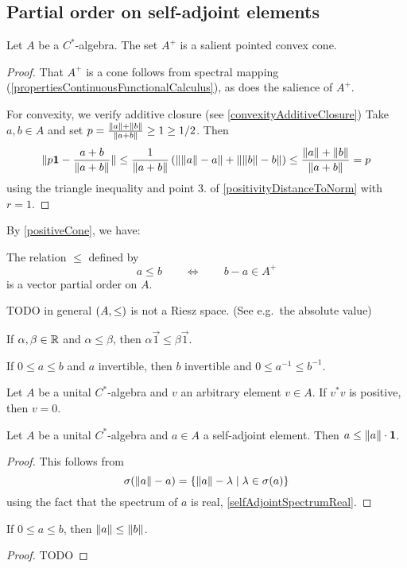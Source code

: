 \subsection{Partial order on self-adjoint elements}
\begin{proposition}
Let $A$ be a $C^*$-algebra. The set $A^+$ is a salient pointed convex cone.
\end{proposition}
\begin{proof}
That $A^+$ is a cone follows from spectral mapping (\ref{propertiesContinuousFunctionalCalculus}), as does the salience of $A^+$.

For convexity, we verify additive closure (see \ref{convexityAdditiveClosure}) Take $a,b\in A$ and set $p= \frac{\lVert a\rVert+\lVert b\rVert}{\lVert a+b\rVert} \geq 1 \geq 1/2$. Then
\[ \lVert p\boldsymbol{\mathrm{1}} - \frac{a+b}{\lVert a+b\rVert}\rVert \leq \frac{1}{\lVert a+b\rVert}\left(\lVert\lVert a\rVert-a\rVert + \lVert\lVert b\rVert-b\rVert\right) \leq \frac{\lVert a\rVert+\lVert b\rVert}{\lVert a+b\rVert} = p \]
using the triangle inequality and point 3. of \ref{positivityDistanceToNorm} with $r=1$.
\end{proof}
By \ref{positiveCone}, we have:
\begin{corollary}
The relation $\leq$ defined by
\[ a\leq b \qquad\iff\qquad b-a\in A^+ \]
is a vector partial order on $A$.
\end{corollary}
TODO in general $\left( A, \leq \right)$ is not a Riesz space. (See e.g.\ the absolute value)

\begin{lemma}
If $\alpha,\beta\in\mathbb{R}$ and $\alpha\leq \beta$, then $\alpha\vec{1}\leq \beta\vec{1}$.
\end{lemma}

\begin{lemma}
If $0\leq a \leq b$ and $a$ invertible, then $b$ invertible and $0\leq a^{-1}\leq b^{-1}$.
\end{lemma}

\begin{lemma}
Let $A$ be a unital $C^*$-algebra and $v$ an arbitrary element $v\in A$. If $v^*v$ is positive, then $v=0$.
\end{lemma}

\begin{proposition}
Let $A$ be a unital $C^*$-algebra and $a\in A$ a self-adjoint element. Then $a\leq \lVert a\rVert\cdot\boldsymbol{\mathrm{1}}$.
\end{proposition}
\begin{proof}
This follows from
\[ \sigma(\lVert a\rVert-a) = \left\{ \lVert a\rVert-\lambda \;\middle|\; \lambda\in\sigma(a) \right\} \]
using the fact that the spectrum of $a$ is real, \ref{selfAdjointSpectrumReal}.
\end{proof}
\begin{corollary}
If $0\leq a \leq b$, then $\lVert a\rVert \leq \lVert b\rVert$.
\end{corollary}
\begin{proof}
TODO
\end{proof}

